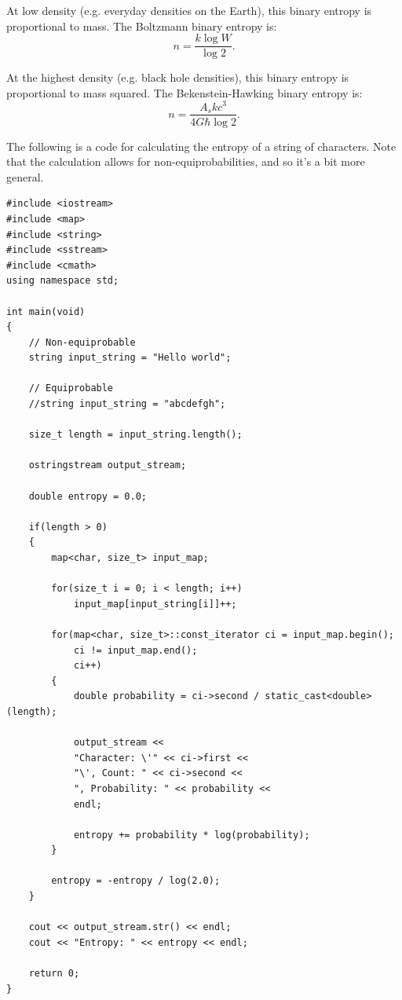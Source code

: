 \documentclass[12pt]{article}
\begin{document}
At low density (e.g. everyday densities on the Earth), this binary entropy is proportional to mass.
The Boltzmann binary entropy is:
\begin{equation}
n = \frac{k \log W}{\log 2}.
\end{equation}

At the highest density (e.g. black hole densities), this binary entropy is proportional to mass squared.
The Bekenstein-Hawking binary entropy is:
\begin{equation}
n = \frac{A_s k c^3}{ 4 G \hbar \log 2}.
\end{equation}

The following is a code for calculating the entropy of a string of characters.
Note that the calculation allows for non-equiprobabilities, and so it's a bit more general.
\begin{lstlisting}
#include <iostream>
#include <map>
#include <string>
#include <sstream>
#include <cmath>
using namespace std;

int main(void)
{
    // Non-equiprobable
    string input_string = "Hello world";

    // Equiprobable
    //string input_string = "abcdefgh";

    size_t length = input_string.length();

    ostringstream output_stream;
    
    double entropy = 0.0;
    
    if(length > 0)
    {
        map<char, size_t> input_map;

        for(size_t i = 0; i < length; i++)
            input_map[input_string[i]]++;
        
        for(map<char, size_t>::const_iterator ci = input_map.begin(); 
			ci != input_map.end(); 
			ci++)
        {
            double probability = ci->second / static_cast<double>(length);
            
            output_stream << 
			"Character: \'" << ci->first << 
			"\', Count: " << ci->second << 
			", Probability: " << probability << 
			endl;
            
            entropy += probability * log(probability);
        }
        
        entropy = -entropy / log(2.0);
    }

    cout << output_stream.str() << endl;
    cout << "Entropy: " << entropy << endl;
    
    return 0;
}

\end{lstlisting}
\end{document}
